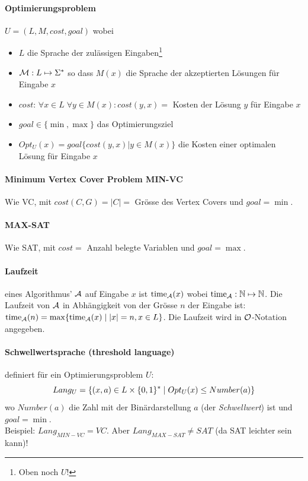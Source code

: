 \paragraph{Optimierungsproblem}
$U = (L, M, cost, goal)$ wobei
\begin{itemize}
    \item $L$ die Sprache der zulässigen Eingaben\footnote{Oben noch $U$!}
    \item $\mathcal{M}: L \mapsto \Sigma^*$ so dass $M(x)$ die Sprache der akzeptierten Lösungen für Eingabe $x$
    \item $cost$: $\forall x \in L \; \forall y \in M(x) : cost(y, x) = $ Kosten der Lösung $y$ für Eingabe $x$
    \item $goal \in \{ \min, \max \}$ das Optimierungsziel
    \item $Opt_U(x) = goal \{ cost(y, x) | y \in M(x) \}$ die Kosten einer optimalen Lösung für Eingabe $x$
\end{itemize}

\paragraph{Minimum Vertex Cover Problem MIN-VC}
Wie VC, mit $cost(C, G) = |C| = $ Grösse des Vertex Covers und $goal = \min$.

\paragraph{MAX-SAT}
Wie SAT, mit $cost = $ Anzahl belegte Variablen und $goal = \max$.

\paragraph{Laufzeit}
eines Algorithmus' $\mathcal{A}$ auf Eingabe $x$ ist $\text{time}_{\mathcal{A}} (x)$
wobei $\text{time}_{\mathcal{A}}: \mathbb{N} \mapsto \mathbb{N}$.
Die Laufzeit von $\mathcal{A}$ in Abhängigkeit von der Grösse $n$ der Eingabe ist:
$\text{time}_{\mathcal{A}} (n) = \max \{ \text{time}_{\mathcal{A}} (x) \; | \; |x| = n, x \in L \}$.
Die Laufzeit wird in  $\mathcal{O}$-Notation angegeben.

\paragraph{Schwellwertsprache (threshold language)} definiert für ein Optimierungsproblem $U$:
$$ Lang_U = \{ (x, a) \in L \times \lbrace 0, 1 \rbrace^* \; | \; Opt_U(x) \leq Number(a) \} $$
wo $Number(a)$ die Zahl mit der Binärdarstellung $a$ (der \emph{Schwellwert}) ist und $goal = \min$.
\\
Beispiel: $Lang_{MIN-VC} = VC$. Aber $Lang_{MAX-SAT} \neq SAT$ (da SAT leichter sein kann)!


